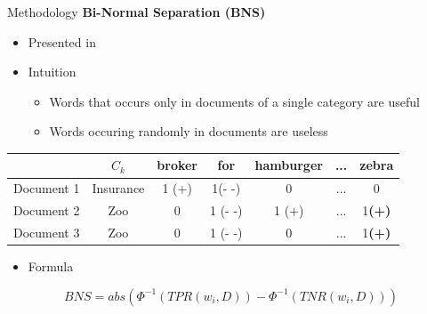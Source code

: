 \begin{frame}[label=metho]{Methodology}
	\textbf{Bi-Normal Separation (BNS)}
	\begin{itemize}
				\item Presented in \cite{Forman}
		\item Intuition
		\begin{itemize}
			\item Words that occurs only in documents of a single category are useful
			\item Words occuring randomly in documents are useless
		\end{itemize}
	\end{itemize}
		\begin{table}[H]
		\begin{tabular}{|c|c|c|c|c|c|c|}
			\hline 
			& $C_k$&  broker  & for & hamburger & ... & zebra   \\ 
			\hline 
			Document 1 &  Insurance &  1 (+) & 1(- -) & 0 & ... & 0 \\ 
			\hline 
			Document 2& Zoo &   0 &  1 (- -) & 1 (+) & ... & 1\textbf{(+)} \\ 
			\hline 
			Document 3 & Zoo &  0 & 1 (- -) & 0 & ... & 1\textbf{(+)}  \\ 
			\hline 
			
		\end{tabular} 
		
	\end{table}
\begin{itemize}
		\item Formula
\end{itemize}
$$BNS = abs(\Phi^{-1}(TPR(w_i, D))- \Phi^{-1}(TNR(w_i, D)))$$

\end{frame}


